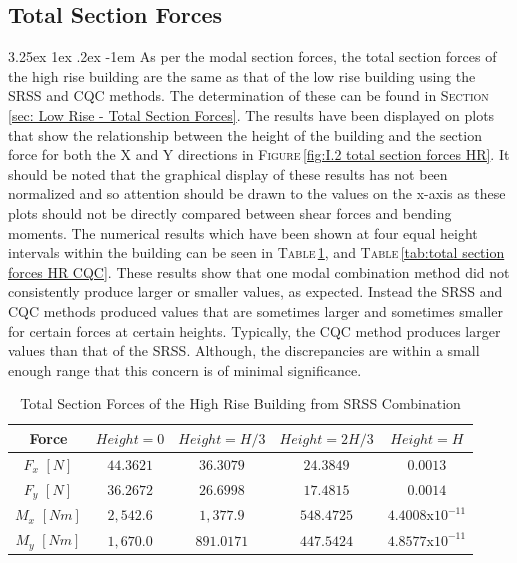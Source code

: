 \documentclass[11pt,a4paper,titlepage]{report}
\makeatletter
\renewcommand\paragraph{\@startsection{paragraph}{5}{\z@}%
  {3.25ex \@plus1ex \@minus.2ex}%
  {-1em}%
  {\normalfont\normalsize\bfseries}}
\makeatother
\begin{document}
\subsection{Total Section Forces} 
\paragraph{}As per the modal section forces, the total section forces of the high rise building are the same as that of the low rise building using the SRSS and CQC methods. The determination of these can be found in \textsc{Section}\,\ref{sec: Low Rise - Total Section Forces}. The results have been displayed on plots that show the relationship between the height of the building and the section force for both the X and Y directions in \textsc{Figure}\,\ref{fig:I.2 total section forces HR}. It should be noted that the graphical display of these results has not been normalized and so attention should be drawn to the values on the x-axis as these plots should not be directly compared between shear forces and bending moments. The numerical results which have been shown at four equal height intervals within the building can be seen in \textsc{Table}\,\ref{tab:total section forces HR SRSS}, and \textsc{Table}\,\ref{tab:total section forces HR CQC}. These results show that one modal combination method did not consistently produce larger or smaller values, as expected. Instead the SRSS and CQC methods produced values that are sometimes larger and sometimes smaller for certain forces at certain heights. Typically, the CQC method produces larger values than that of the SRSS. Although, the discrepancies are within a small enough range that this concern is of minimal significance.
\begin{table}[h]
    \centering
    \begin{tabular}{c|c|c|c|c}
    Force & $Height=0$ & $Height=H/3$ & $Height=2H/3$ & $Height=H$\\
    \hline
    $F_x$ $[N]$  & $44.3621$ & $36.3079$ & $24.3849$ & $0.0013$\\
    $F_y$  $[N]$ & $36.2672$ & $26.6998$ & $17.4815$ & $0.0014$\\
    $M_x$ $[Nm]$  & $2,542.6$ & $1,377.9$ & $548.4725$ & $4.4008$x$10^{-11}$\\
    $M_y$  $[Nm]$ & $1,670.0$ & $891.0171$ & $447.5424$ & $4.8577$x$10^{-11}$\\
    \end{tabular}
    \caption{Total Section Forces of the High Rise Building from SRSS Combination}
    \label{tab:total section forces HR SRSS}
\end{table}
\end{document}
